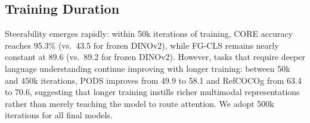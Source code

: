 
\subsection{Training Duration}
\label{subsec:training_duration}

Steerability emerges rapidly: within 50k iterations of training, CORE accuracy reaches 95.3\%
(vs.\ 43.5 for frozen DINOv2), 
while FG-CLS remains nearly constant at 89.6 (vs.\ 89.2 for frozen DINOv2).
However, tasks that require deeper language understanding continue improving with longer training: between 50k and 450k iterations, 
PODS improves from 49.9 to 58.1
and RefCOCOg from 63.4 to 70.6, suggesting that longer training instills richer multimodal representations rather than merely teaching the model to route attention.
We adopt 500k iterations for all final models.


